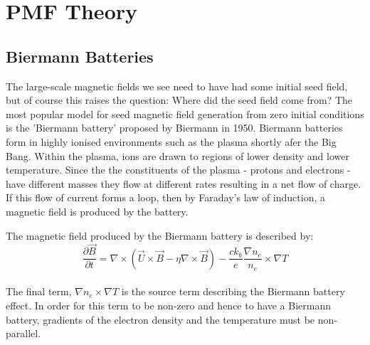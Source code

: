 \section{PMF Theory}

\subsection{Biermann Batteries}

The large-scale magnetic fields we see need to have had some initial seed field, but of course this raises the question: Where did the seed field come from? The most popular model for seed magnetic field generation from zero initial conditions is the 'Biermann battery' proposed by Biermann in 1950. Biermann batteries form in highly ionised environments such as the plasma shortly afer the Big Bang. Within the plasma, ions are drawn to regions of lower density and lower temperature. Since the the constituents of the plasma - protons and electrons - have different masses they flow at different rates resulting in a net flow of charge. If this flow of current forms a loop, then by Faraday's law of induction, a magnetic field is produced by the battery.

The magnetic field produced by the Biermann battery is described by:
\begin{equation}
\frac{\partial \vec{B}}{\partial t} = \nabla\times(\vec{U}\times\vec{B}-\eta\nabla \times\vec{B}) - \frac{c k_{b}}{e}\frac{\nabla n_e}{n_e} \times \nabla T
\end{equation}
\\
The final term, $\nabla n_e \times \nabla T$ is the source term describing the Biermann battery effect. In order for this term to be non-zero and hence to have a Biermann battery, gradients of the electron density and the temperature must be non-parallel.

